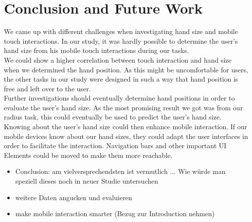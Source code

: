 \documentclass{sigchi}
\begin{document}
\section{Conclusion and Future Work}
We came up with different challenges when investigating hand size and mobile touch interactions. In our study, it was hardly possible to determine the user's hand size from his mobile touch interactions during our tasks.\\
We could show a higher correlation between touch interaction and hand size when we determined the hand position. As this might be uncomfortable for users, the other tasks in our study were designed in such a way that hand position is free and left over to the user.\\
Further investigations should eventually determine hand positions in order to evaluate the user's hand size. As the most promising result we got was from our radius task, this could eventually be used to predict the user's hand size.\\ 
Knowing about the user's hand size could then enhance mobile interaction. If our mobile devices know about our hand sizes, they could adapt the user interfaces in order to facilitate the interaction. Navigation bars and other important UI Elements could be moved to make them more reachable.


\begin{itemize}
\item Conclusion: am vielversprechendsten ist vermutlich ... Wie würde man speziell dieses noch in neuer Studie untersuchen
\item weitere Daten angucken und evaluieren
\item make mobile interaction smarter (Bezug zur Introduction nehmen)
\end{itemize}



%
%
%
%
%
\balance{}


\balance{}



\end{document}
